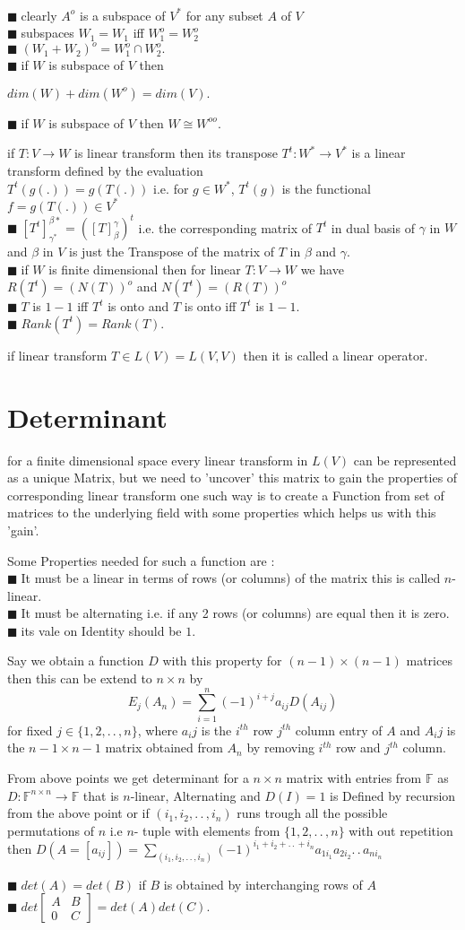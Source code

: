 \documentclass[11pt]{extarticle}
\newcommand{\F}{\mathbb{F}}
\newcommand{\ra}{\rightarrow}
\newcommand{\ck}{.\,.\,}
\newcommand{\tm}{\times}
\newcommand{\tbx}[2][]{
	\begin{tcolorbox}[enhanced,breakable,size=small,colback=black!2!white,title={#1},arc is angular, arc=1.5mm,drop fuzzy shadow]
		#2
	\end{tcolorbox}
}
\newcommand{\y}{$\blacksquare\;$}
\newcommand{\yi}{\\$\blacksquare\;$}
\begin{document}
\begin{multicols}{2}
{ \yi clearly $ A^o$ is a subspace of $ V^* $ for any subset $ A $ of $ V $ 
 \yi subspaces $ W_1=W_1 $ iff $ W_1^o=W_2^o$ 
 \yi $ (W_1+W_2)^o=W_1^o\cap W_2^o.$ 
 \yi if $ W $ is subspace of $ V $ then 
 \begin{center}
 	$ dim(W)+dim(W^o)=dim(V) .$
 \end{center}
 \y if $ W $ is subspace of $ V $ then $ W\cong W^{oo} .$ }
 \tbx[Transpose of linear transform]{ if $ T:V\ra W $ is linear transform then its transpose $T^t:W^*\ra V^* $ is a linear transform defined by the evaluation \\ $ T^t(g(.))=g(T(.)) $  i.e. for $ g\in  W^*$,
 $ T^t(g) $ is the functional $ f=g(T(.)) \in V^*$
 \yi $ [T^t]_{\gamma^*}^{\beta*}=([T]_\beta ^\gamma)^t $ i.e. the corresponding matrix of $ T^t $ in dual basis of $ \gamma $ in $ W $ and $ \beta $ in $ V $ is just the Transpose of the matrix of $ T $ in $ \beta  $ and $ \gamma. $ 
 \yi if $ W $ is finite dimensional then for linear $ T:V\ra W $ we have\\
  $ R(T^t)=(N(T))^o $ and $ N(T^t)=(R(T))^o $  
 \yi $ T $ is $ 1-1 $ iff $ T^t $ is onto and $ T $ is onto iff $ T^t $ is $ 1-1 .$
 \yi $ Rank(T^t) =Rank(T).$
    }
\tbx{ if linear transform $ T\in L(V)=L(V,V) $ then it is called a linear operator. }
	\section{Determinant}
\tbx[Motivation]{for a finite dimensional space every linear transform in $ L(V) $ can be represented as a unique Matrix, but we need to 'uncover' this matrix to gain the properties of corresponding linear transform one such way is to create a Function from set of matrices to the underlying field with some properties which helps us with this 'gain'. }
\tbx{ Some Properties needed for such a function are :
\yi It must be a linear in terms of rows (or columns) of the matrix this is called $ n $-linear.
\yi It must be alternating i.e. if any 2 rows (or columns) are equal then it is zero.
\yi its vale on Identity should be $ 1 $.}
\tbx{  Say we obtain a function $ D $ with this property for $ (n-1)\tm (n-1) $ matrices then this can be extend to $ n\tm n $ by 
\[E_j(A_n)=\sum\limits_{i=1}^{n} (-1)^{i+j} a_{ij}D(A_{ij})\] for fixed $ j\in \{1,2,\ck , n\} $, where $ a_ij $ is the $ i^{th} $ row $ j^{th} $ column entry of $ A $ and $ A_ij $ is the $ n-1\tm n-1 $ matrix obtained from $ A_n $ by removing $ i^{th} $ row and $ j^{th} $ column.}
\tbx[Definition ]{ From above points we get determinant for a $ n\tm n  $ matrix with entries from $ \F $ as $ D: \F^{n\tm n}\ra \F$ that is $ n$-linear, Alternating and $ D(I)=1 $ is Defined by 
recursion from the above point or if $ (i_1,i_2,\ck,i_n) $ runs trough all the possible permutations of $ n $ i.e $ n $- tuple with elements from $ \{1,2,\ck, n\} $ with out repetition then 
$ D(A=[a_{ij}])=\sum\limits_{(i_1,i_2,\ck,i_n)} (-1)^{i_1+i_2+\ck+i_n}a_{1i_1}a_{2i_2}\ck a_{ni_n} $ }
\tbx[Additional Properties ]{ 
\y $ det(A)=det(B) $ if $ B $ is obtained by interchanging rows of $ A $ 
\yi $  det \begin{bmatrix}
	A &B\\
	0 & C
\end{bmatrix} 
= det(A)det(C).$ }

\end{multicols}
\end{document}
